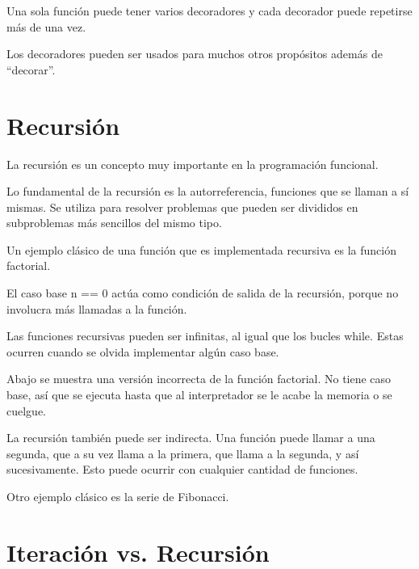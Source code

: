 \documentclass{report}
\newcommand{\doble}[1]{``#1''}
\begin{document}

Una sola función puede tener varios decoradores y cada decorador puede repetirse más de una vez.


Los decoradores pueden ser usados para muchos otros propósitos además de \doble{decorar}.



\section{Recursión}

La recursión es un concepto muy importante en la programación funcional.

Lo fundamental de la recursión es la autorreferencia, funciones que se llaman a sí mismas. Se utiliza para resolver problemas que pueden ser divididos en subproblemas más sencillos del mismo tipo.

Un ejemplo clásico de una función que es implementada recursiva es la función factorial.


El caso base n == 0 actúa como condición de salida de la recursión, porque no involucra más llamadas a la función.

Las funciones recursivas pueden ser infinitas, al igual que los bucles while. Estas ocurren cuando se olvida implementar algún caso base.

Abajo se muestra una versión incorrecta de la función factorial. No tiene caso base, así que se ejecuta hasta que al interpretador se le acabe la memoria o se cuelgue.


La recursión también puede ser indirecta. Una función puede llamar a una segunda, que a su vez llama a la primera, que llama a la segunda, y así sucesivamente. Esto puede ocurrir con cualquier cantidad de funciones.


Otro ejemplo clásico es la serie de Fibonacci.


\section{Iteración vs. Recursión}
\end{document}

